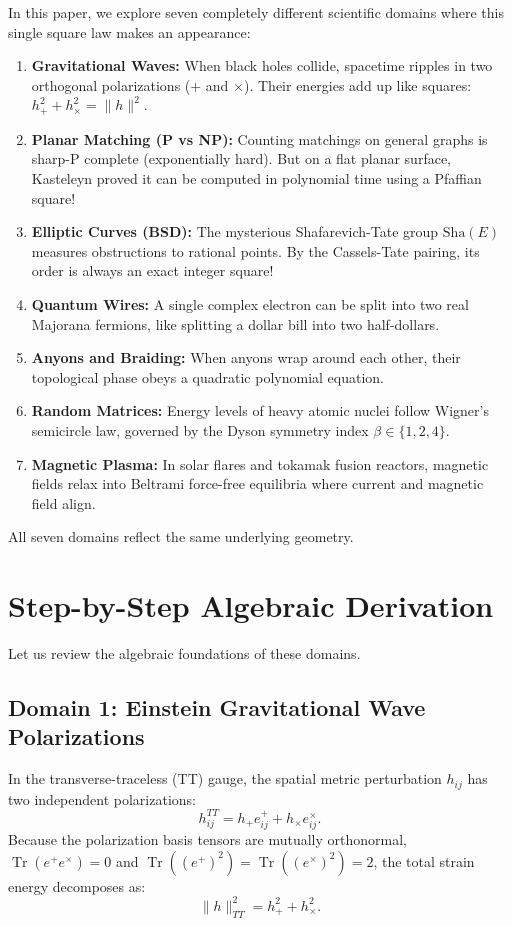 \documentclass[11pt,a4paper]{article}
\providecommand{\Sha}{\mathrm{Sha}}
\theoremstyle{definition}
\begin{document}
In this paper, we explore seven completely different scientific domains where this single square law makes an appearance:
\begin{enumerate}
    \item \textbf{Gravitational Waves:} When black holes collide, spacetime ripples in two orthogonal polarizations ($+$ and $\times$). Their energies add up like squares: $h_+^2 + h_\times^2 = \|h\|^2$.
    \item \textbf{Planar Matching (P vs NP):} Counting matchings on general graphs is sharp-P complete (exponentially hard). But on a flat planar surface, Kasteleyn proved it can be computed in polynomial time using a Pfaffian square!
    \item \textbf{Elliptic Curves (BSD):} The mysterious Shafarevich-Tate group $\Sha(E)$ measures obstructions to rational points. By the Cassels-Tate pairing, its order is always an exact integer square!
    \item \textbf{Quantum Wires:} A single complex electron can be split into two real Majorana fermions, like splitting a dollar bill into two half-dollars.
    \item \textbf{Anyons and Braiding:} When anyons wrap around each other, their topological phase obeys a quadratic polynomial equation.
    \item \textbf{Random Matrices:} Energy levels of heavy atomic nuclei follow Wigner's semicircle law, governed by the Dyson symmetry index $\beta \in \{1, 2, 4\}$.
    \item \textbf{Magnetic Plasma:} In solar flares and tokamak fusion reactors, magnetic fields relax into Beltrami force-free equilibria where current and magnetic field align.
\end{enumerate}
All seven domains reflect the same underlying geometry.


\section{Step-by-Step Algebraic Derivation}

Let us review the algebraic foundations of these domains.

\subsection{Domain 1: Einstein Gravitational Wave Polarizations}
In the transverse-traceless (TT) gauge, the spatial metric perturbation $h_{ij}$ has two independent polarizations:
\begin{equation}
h_{ij}^{TT} = h_+ e_{ij}^+ + h_\times e_{ij}^\times.
\end{equation}
Because the polarization basis tensors are mutually orthonormal, $\operatorname{Tr}(e^+ e^\times) = 0$ and $\operatorname{Tr}((e^+)^2) = \operatorname{Tr}((e^\times)^2) = 2$, the total strain energy decomposes as:
\begin{equation}
\|h\|_{TT}^2 = h_+^2 + h_\times^2.
\end{equation}
\end{document}
